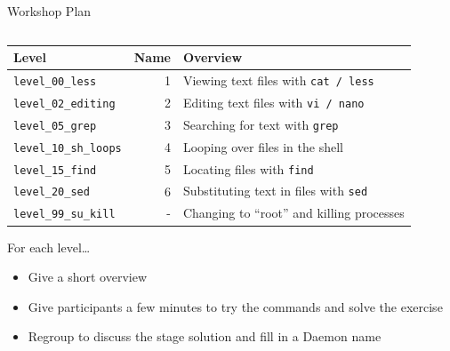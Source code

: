 \documentclass[mathserif]{beamer}
\begin{document}
\begin{frame}[label={sec:org641d776},fragile]{Workshop Plan}
 \vspace{-.2in}
\begin{columns}
\begin{column}{1.1\columnwidth}
\begin{block}{}
\begin{center}
\begin{tabular}{lrl}
\hline
Level & Name & Overview\\[0pt]
\hline
\texttt{level\_00\_less} & 1 & Viewing text files with \texttt{cat / less}\\[0pt]
\texttt{level\_02\_editing} & 2 & Editing text files with \texttt{vi / nano}\\[0pt]
\texttt{level\_05\_grep} & 3 & Searching for text with \texttt{grep}\\[0pt]
\texttt{level\_10\_sh\_loops} & 4 & Looping over files in the shell\\[0pt]
\texttt{level\_15\_find} & 5 & Locating files with \texttt{find}\\[0pt]
\texttt{level\_20\_sed} & 6 & Substituting text in files with \texttt{sed}\\[0pt]
\texttt{level\_99\_su\_kill} & - & Changing to ``root'' and killing processes\\[0pt]
\hline
\end{tabular}
\end{center}

For each level\ldots{}
\begin{itemize}
\item Give a short overview
\item Give participants a few minutes to try the commands and solve the exercise
\item Regroup to discuss the stage solution and fill in a Daemon name
\end{itemize}
\end{block}
\end{column}
\end{columns}
\end{frame}
\end{document}
